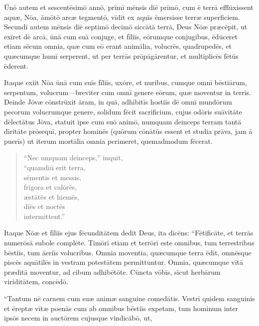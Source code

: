 \Versus Ūnō autem et sescentēsimō annō, prīmī mēnsis diē prīmō, cum ē terrā efflūxissent aquæ, Nōa, āmōtō arcæ tegmentō, vīdit ex aquīs ēmersisse terræ superficiem.
\Versus Secundī autem mēnsis diē septimō decimō siccātā terrā,
\Versus Deus Nōæ præcēpit, ut exīret dē arcā,
\Versus ūnā cum suā conjuge, et fīliīs, eōrumque conjugibus,
\Versus ēdūceret etiam sēcum omnia, quæ cum eō erant animālia, volucrēs, quadrupedēs, et quæcumque humī serperent, ut per terrās prōpāgārentur, et multiplicēs fētūs ēderent.

\Versus Itaque exiit Nōa ūnā cum suīs fīliīs, uxōre, et nuribus,
\Versus cumque omnī bēstiārum, serpentum, volucrum—breviter cum omnī genere eōrum, quæ moventur in terrīs.
\Versus Deinde Jōvæ cōnstrūxit āram, in quā, adhibitīs hostiīs dē omnī mundōrum pecorum volucrumque genere, solidum fēcit sacrificium,
\Versus cujus odōris suāvitāte dēlectātus Jōva, statuit ipse cum suō animō, numquam deinceps terram tantā dīritāte prōsequī, propter hominēs (quōrum cōnātūs essent et studia prāva, jam ā puerīs) ut iterum mortālia omnia perimeret, quemadmodum fēcerat.

\begin{verse}
\begin{patverse*}
\Versus ``Nec umquam deinceps,'' inquit,\\
``quamdiū erit terra,\\
sēmentis et messis,\\
frīgora et calōrēs,\\
æstātēs et hiemēs,\\
diēs et noctēs\\
intermittent.''
\end{patverse*}
\end{verse}



\Caput
\Versus Itaque Nōæ et fīliīs ejus fēcunditātem dedit Deus, ita dīcēns: ``Fētificāte, et terrās numerōsā subole complēte.
\Versus Timōrī etiam et terrōrī este omnibus, tum terrestribus bēstiīs, tum āeriīs volucribus. Omnia moventia, quæcumque terra ēdit, omnēsque piscēs aquātilēs in vestram potestātem permittuntur.
\Versus Omnia, quæcumque vītā præditā moventur, ad cibum adhibētōte. Cūncta vōbīs, sīcut herbārum viriditātem, concēdō.

\Versus ``Tantum nē carnem cum suæ animæ sanguine comedātis.
\Versus Vestrī quidem sanguinis et ēreptæ vītæ poenās cum ab omnibus bēstiīs expetam, tum hominum inter ipsōs necem in auctōrem cujusque vindicābō,
\Versus ut,

